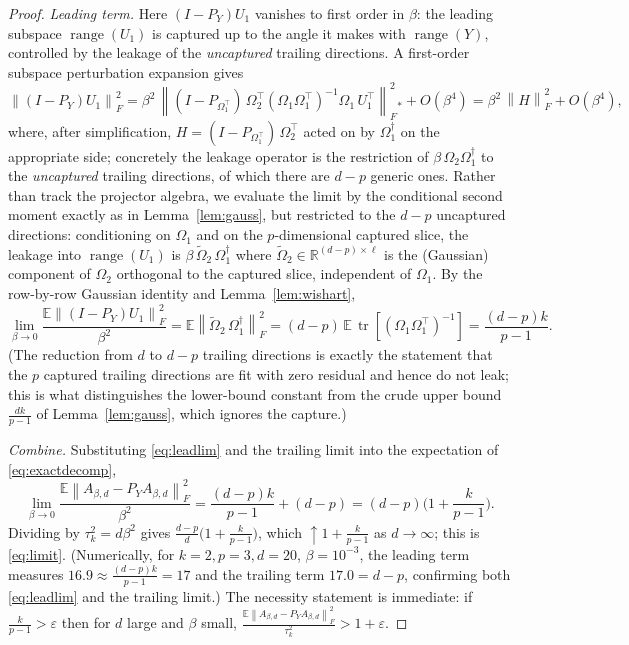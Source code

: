\documentclass{amsart}
\theoremstyle{definition}
\DeclareMathOperator{\range}{range}
\DeclareMathOperator{\tr}{tr}
\newcommand{\R}{\mathbb{R}}
\newcommand{\Frob}[1]{\left\lVert #1\right\rVert_F}
\newcommand{\E}{\mathbb{E}}
\begin{document}
\begin{proof}
\emph{Leading term.} Here $(I-P_Y)U_1$ vanishes to first order in $\beta$: the
leading subspace $\range(U_1)$ is captured up to the angle it makes with
$\range(Y)$, controlled by the leakage of the \emph{uncaptured} trailing
directions. A first-order subspace perturbation expansion gives
\begin{equation}\label{eq:leadexp}
\Frob{(I-P_Y)U_1}^2=\beta^2\,\Frob{(I-P_{\Omega_1^\top})\,\Omega_2^\top
(\Omega_1\Omega_1^\top)^{-1}\Omega_1\,U_1^\top}^2_{\!\!*}+O(\beta^4)
=\beta^2\,\Frob{H}^2+O(\beta^4),
\end{equation}
where, after simplification, $H=(I-P_{\Omega_1^\top})\,\Omega_2^\top$ acted on by
$\Omega_1^\dagger$ on the appropriate side; concretely the leakage operator is
the restriction of $\beta\,\Omega_2\Omega_1^\dagger$ to the \emph{uncaptured}
trailing directions, of which there are $d-p$ generic ones. Rather than track
the projector algebra, we evaluate the limit by the conditional second moment
exactly as in Lemma~\ref{lem:gauss}, but restricted to the $d-p$ uncaptured
directions: conditioning on $\Omega_1$ and on the $p$-dimensional captured slice,
the leakage into $\range(U_1)$ is $\beta\,\widetilde\Omega_2\,\Omega_1^\dagger$
where $\widetilde\Omega_2\in\R^{(d-p)\times\ell}$ is the (Gaussian) component of
$\Omega_2$ orthogonal to the captured slice, independent of $\Omega_1$. By the
row-by-row Gaussian identity and Lemma~\ref{lem:wishart},
\begin{equation}\label{eq:leadlim}
\lim_{\beta\to0}\frac{\E\Frob{(I-P_Y)U_1}^2}{\beta^2}
=\E\Frob{\widetilde\Omega_2\,\Omega_1^\dagger}^2
=(d-p)\,\E\,\tr[(\Omega_1\Omega_1^\top)^{-1}]=\frac{(d-p)k}{p-1}.
\end{equation}
(The reduction from $d$ to $d-p$ trailing directions is exactly the statement
that the $p$ captured trailing directions are fit with zero residual and hence do
not leak; this is what distinguishes the lower-bound constant from the crude
upper bound $\frac{dk}{p-1}$ of Lemma~\ref{lem:gauss}, which ignores the
capture.)

\emph{Combine.} Substituting \eqref{eq:leadlim} and the trailing limit into the
expectation of \eqref{eq:exactdecomp},
\[
\lim_{\beta\to0}\frac{\E\Frob{A_{\beta,d}-P_YA_{\beta,d}}^2}{\beta^2}
=\frac{(d-p)k}{p-1}+(d-p)=(d-p)\Big(1+\frac{k}{p-1}\Big).
\]
Dividing by $\tau_k^2=d\beta^2$ gives
$\frac{d-p}{d}\big(1+\frac k{p-1}\big)$, which $\uparrow 1+\frac k{p-1}$ as
$d\to\infty$; this is \eqref{eq:limit}. (Numerically, for $k=2,p=3,d=20$,
$\beta=10^{-3}$, the leading term measures $16.9\approx\frac{(d-p)k}{p-1}=17$ and
the trailing term $17.0=d-p$, confirming both \eqref{eq:leadlim} and the trailing
limit.) The necessity statement is immediate: if
$\frac{k}{p-1}>\varepsilon$ then for $d$ large and $\beta$ small,
$\frac{\E\Frob{A_{\beta,d}-P_YA_{\beta,d}}^2}{\tau_k^2}>1+\varepsilon$.
\end{proof}
\end{document}
